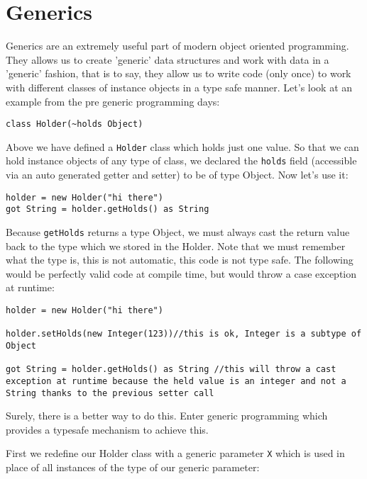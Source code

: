 \documentclass[conc-doc]{subfiles}
\begin{document}
	
	\chapter[Generics]{Generics}
	\label{ch:generics}

Generics are an extremely useful part of modern object oriented programming. They allows us to create 'generic' data structures and work with data in a 'generic' fashion, that is to say, they allow us to write code (only once) to work with different classes of instance objects in a type safe manner. Let's look at an example from the pre generic programming days:

\begin{lstlisting}
class Holder(~holds Object)
\end{lstlisting}

Above we have defined a \lstinline{Holder} class which holds just one value. So that we can hold instance objects of any type of class, we declared the \lstinline{holds} field (accessible via an auto generated getter and setter) to be of type Object. Now let's use it:

\begin{lstlisting}
holder = new Holder("hi there")
got String = holder.getHolds() as String
\end{lstlisting}

Because \lstinline{getHolds} returns a type Object, we must always cast the return value back to the type which we stored in the Holder. Note that we must remember what the type is, this is not automatic, this code is not type safe. The following would be perfectly valid code at compile time, but would throw a case exception at runtime:

\begin{lstlisting}
holder = new Holder("hi there")

holder.setHolds(new Integer(123))//this is ok, Integer is a subtype of Object

got String = holder.getHolds() as String //this will throw a cast exception at runtime because the held value is an integer and not a String thanks to the previous setter call
\end{lstlisting}

Surely, there is a better way to do this. Enter generic programming which provides a typesafe mechanism to achieve this.

First we redefine our Holder class with a generic parameter \lstinline{X} which is used in place of all instances of the type of our generic parameter:
\end{document}
